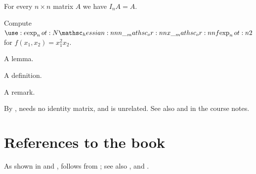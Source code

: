 \documentclass{article}
\begin{document}
\begin{proposition}[Identity]\label{prop:id}
  For every $n \times n$ matrix $A$ we have $I_n A = A$.
\end{proposition}
\begin{exercise}\label{ex:hess}
  Compute $\hessian*{2}$ for $f(x_1, x_2) = x_1^2 x_2$.
\end{exercise}
\begin{lemma}\label{lem:a} A lemma. \end{lemma}
\begin{definition} A definition. \end{definition}
\begin{remark} A remark. \end{remark}
By \proposition{\ref{prop:id}}, \exercise{\ref{ex:hess}} needs no identity
matrix, and \lemma{\ref{lem:a}} is unrelated.
See also  and  in the course notes.

\section*{References to the book}
As shown in  and ,  follows
from ; see also ,  and .
\end{document}
